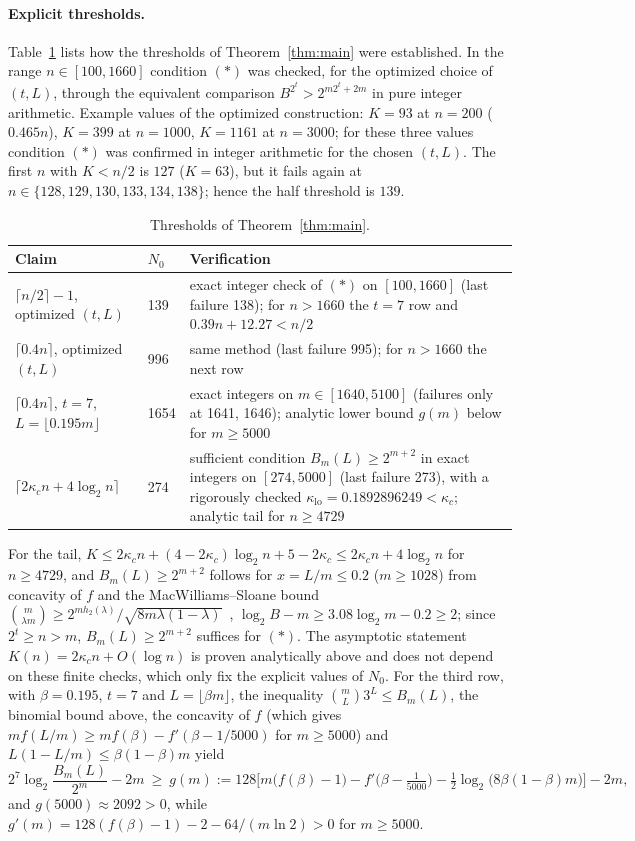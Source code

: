 \documentclass[aps,pra,onecolumn,superscriptaddress,nofootinbib,longbibliography,10pt]{revtex4-2}
\theoremstyle{definition}
\newcommand{\kc}{\kappa_c}
\begin{document}
\paragraph*{Explicit thresholds.} Table~\ref{tab:N0} lists how the thresholds of Theorem~\ref{thm:main} were established. In the range $n\in[100,1660]$ condition $(*)$ was checked, for the optimized choice of $(t,L)$, through the equivalent comparison $B^{2^t}>2^{m2^t+2m}$ in pure integer arithmetic. Example values of the optimized construction: $K=93$ at $n=200$ ($0.465n$), $K=399$ at $n=1000$, $K=1161$ at $n=3000$; for these three values condition $(*)$ was confirmed in integer arithmetic for the chosen $(t,L)$. The first $n$ with $K<n/2$ is $127$ ($K=63$), but it fails again at $n\in\{128,129,130,133,134,138\}$; hence the half threshold is $139$.

\begin{table}[h]
\caption{Thresholds of Theorem~\ref{thm:main}.}\label{tab:N0}
\begin{tabular}{p{}p{}p{}}
\toprule
Claim & $N_0$ & Verification\\
\midrule
$\lceil n/2\rceil-1$, optimized $(t,L)$ & 139 & exact integer check of $(*)$ on $[100,1660]$ (last failure 138); for $n>1660$ the $t=7$ row and $0.39n+12.27<n/2$\\
$\lceil0.4n\rceil$, optimized $(t,L)$ & 996 & same method (last failure 995); for $n>1660$ the next row\\
$\lceil0.4n\rceil$, $t=7$, $L=\lfloor0.195m\rfloor$ & 1654 & exact integers on $m\in[1640,5100]$ (failures only at 1641, 1646); analytic lower bound $g(m)$ below for $m\ge5000$\\
$\lceil2\kc n+4\log_2n\rceil$ & 274 & sufficient condition $B_m(L)\ge2^{m+2}$ in exact integers on $[274,5000]$ (last failure 273), with a rigorously checked $\kappa_{\mathrm{lo}}=0.1892896249<\kc$; analytic tail for $n\ge4729$\\
\bottomrule
\end{tabular}
\end{table}

\noindent For the tail, $K\le2\kc n+(4-2\kc)\log_2n+5-2\kc\le2\kc n+4\log_2n$ for $n\ge4729$, and $B_m(L)\ge2^{m+2}$ follows for $x=L/m\le0.2$ ($m\ge1028$) from concavity of $f$ and the MacWilliams--Sloane bound $\binom{m}{\lambda m}\ge2^{mh_2(\lambda)}/\sqrt{8m\lambda(1-\lambda)}$~\cite{MS77}, $\log_2B-m\ge3.08\log_2m-0.2\ge2$; since $2^t\ge n>m$, $B_m(L)\ge2^{m+2}$ suffices for $(*)$. The asymptotic statement $K(n)=2\kc n+O(\log n)$ is proven analytically above and does not depend on these finite checks, which only fix the explicit values of $N_0$. For the third row, with $\beta=0.195$, $t=7$ and $L=\lfloor\beta m\rfloor$, the inequality $\binom mL3^L\le B_m(L)$, the binomial bound above, the concavity of $f$ (which gives $mf(L/m)\ge mf(\beta)-f'(\beta-1/5000)$ for $m\ge5000$) and $L(1-L/m)\le\beta(1-\beta)m$ yield
\[
2^7\log_2\frac{B_m(L)}{2^m}-2m\ \ge\ g(m):=128\Big[m\big(f(\beta)-1\big)-f'\big(\beta-\tfrac{1}{5000}\big)-\tfrac12\log_2\big(8\beta(1-\beta)m\big)\Big]-2m,
\]
and $g(5000)\approx2092>0$, while $g'(m)=128(f(\beta)-1)-2-64/(m\ln2)>0$ for $m\ge5000$.
\end{document}
